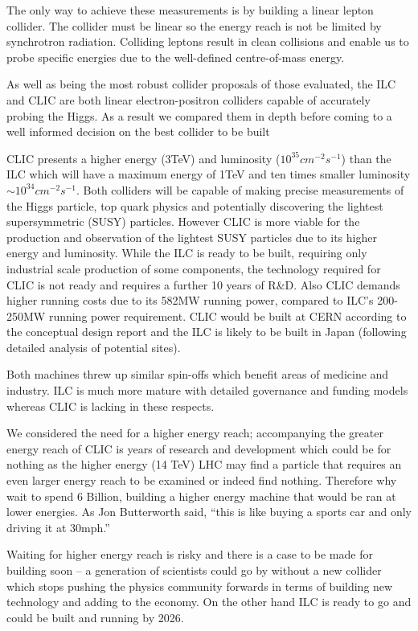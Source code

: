 The only way to achieve these measurements is by building a linear lepton collider. The collider must be linear so the energy reach is not be limited by synchrotron radiation. Colliding leptons result in clean collisions and enable us to probe specific energies due to the well-defined centre-of-mass energy.

As well as being the most robust collider proposals of those evaluated, the ILC and CLIC are both linear electron-positron colliders capable of accurately probing the Higgs. As a result we compared them in depth before coming to a well informed decision on the best collider to be built

CLIC presents a higher energy (3TeV) and luminosity ($10^{35} cm^{-2} s^{-1}$) than the ILC which will have a maximum energy of 1TeV and ten times smaller luminosity $\sim10^{34} cm^{-2} s^{-1}$. Both colliders will be capable of making precise measurements of the Higgs particle, top quark physics and potentially discovering the lightest supersymmetric (SUSY) particles. However CLIC is more viable for the production and observation of the lightest SUSY particles due to its higher energy and luminosity. While the ILC is ready to be built, requiring only industrial scale production of some components, the technology required for CLIC is not ready and requires a further 10 years of R\&D. Also CLIC demands higher running costs due to its 582MW running power, compared to ILC’s 200-250MW running power requirement. CLIC would be built at CERN according to the conceptual design report and the ILC is likely to be built in Japan (following detailed analysis of potential sites).  

Both machines threw up similar spin-offs which benefit areas of medicine and industry. ILC is much more mature with detailed governance and funding models whereas CLIC is lacking in these respects.

We considered the need for a higher energy reach; accompanying the greater energy reach of CLIC is years of research and development which could be for nothing as the higher energy (14 TeV) LHC may find a particle that requires an even larger energy reach to be examined or indeed find nothing. Therefore why wait to spend 6 Billion, building a higher energy machine that would be ran at lower energies. As Jon Butterworth said, ``this is like buying a sports car and only driving it at 30mph.'' \cite{Butterworth:Interview}

Waiting for higher energy reach is risky and there is a case to be made for building soon – a generation of scientists could go by without a new collider which stops pushing the physics community forwards in terms of building new technology and adding to the economy. On the other hand ILC is ready to go and could be built and running by 2026.

